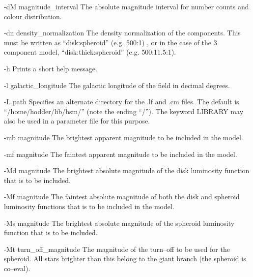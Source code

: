 \documentclass[11pt,twoside]{article}
\begin{document}
\begin{clo}{-dM magnitude\_interval}
The absolute  magnitude  interval for  number counts and colour distribution.
\end{clo}

\begin{clo}{-dn density\_normalization}
The density normalization of the components. This must be written as 
``disk:spheroid'' (e.g. 500:1) , or in the case of the 3 component model, 
``disk:thick:spheroid'' (e.g. 500:11.5:1).
\end{clo}

\begin{clo}{-h}
Prints a short help message.
\end{clo}

\begin{clo}{-l galactic\_longitude}
The galactic longitude of the field in decimal degrees.
\end{clo}

\begin{clo}{-L path}
Specifies an alternate directory for the .lf and .cm files.  The
default is  ``/home/hodder/lib/bsm/''  (note the ending ``/'').  The
keyword LIBRARY  may also be  used in a parameter file for  this
purpose.
\end{clo}

\begin{clo}{-mb magnitude}
The brightest apparent magnitude to be included in the model.
\end{clo}

\begin{clo}{-mf magnitude}
The faintest apparent magnitude to be included in the model.
\end{clo}

\begin{clo}{-Md magnitude}
The brightest absolute magnitude of the disk luminosity function that is
to be included.
\end{clo}

\begin{clo}{-Mf magnitude}
The faintest absolute magnitude of both the disk and spheroid luminosity
functions that is to be included in the model.
\end{clo}

\begin{clo}{-Ms magnitude}
The brightest absolute magnitude of the spheroid luminosity function that is
to be included.
\end{clo}

\begin{clo}{-Mt turn\_off\_magnitude}
The magnitude of the turn--off to be used for the spheroid. All stars brighter
than this belong to the giant branch (the spheroid is co--eval). 
\end{clo}
\end{document}
